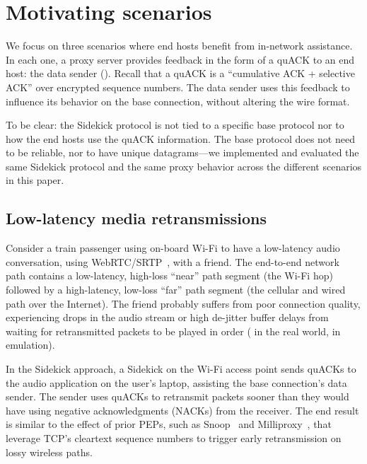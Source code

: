 \section{Motivating scenarios}
\label{sec:sidekick:motivating}



We focus on three scenarios where end hosts benefit from in-network assistance.
In each one, a proxy server provides feedback in the form of a quACK to an end
host: the data sender (). Recall that a quACK is a
``cumulative ACK + selective ACK'' over encrypted sequence numbers. The data
sender uses this feedback to influence its behavior on the base connection,
without altering the wire format.

To be clear: the Sidekick protocol is not tied to a specific base protocol
nor to how the end hosts use the quACK information. The base protocol does not
need to be reliable, nor to have unique datagrams---we implemented and evaluated
the same Sidekick protocol and the same proxy behavior across the different
scenarios in this paper.

\subsection{Low-latency media retransmissions}
\label{sec:sidekick:motivating:media}

Consider a train passenger using on-board Wi-Fi to have a low-latency audio
conversation, using WebRTC/SRTP~\cite{rfc8834webrtc}, with a friend. The
end-to-end network path contains a low-latency, high-loss ``near'' path
segment (the Wi-Fi hop) followed by a high-latency, low-loss ``far'' path
segment (the cellular and wired path over the Internet). The friend probably
suffers from poor connection quality, experiencing drops in the audio stream or
high de-jitter buffer delays from waiting for retransmitted packets to be
played in order ( in the real world,
 in emulation).

In the Sidekick approach, a Sidekick on the Wi-Fi access point sends quACKs to
the audio application on the user's laptop, assisting the base connection's
data sender. The sender uses quACKs to retransmit packets sooner than they
would have using negative acknowledgments (NACKs) from the receiver. The end
result is similar to the effect of prior PEPs, such as
Snoop~\cite{balakrishnan1995snoop} and Milliproxy~\cite{polese2017milliproxy},
that leverage TCP's cleartext sequence numbers to trigger early retransmission
on lossy wireless paths.

